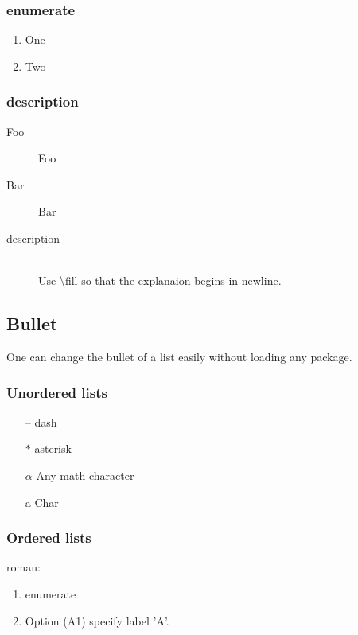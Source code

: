 \subsubsection{enumerate}
\begin{enumerate}
    \item One
    \item Two
\end{enumerate}

\subsubsection{description}
\begin{description}
    \item[Foo] Foo 
    \item[Bar] Bar
    \item[description] \hfill \\
	Use \textbackslash{fill} so that the explanaion begins in newline.
\end{description}

\subsection{Bullet}
One can change the bullet of a list easily without loading any package.

\subsubsection{Unordered lists}
\begin{itemize}
    \item[--] dash
    \item[$\ast$] asterisk
    \item[$\alpha$] Any math character
    \item[a] Char
\end{itemize}

\subsubsection{Ordered lists}

roman:	\\
\begin{enumerate}[label = (\roman*)]	%
    \item enumerate
    \item Option (A1) specify label 'A'.
\end{enumerate}

